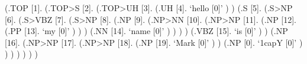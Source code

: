 \documentclass[10pt]{article}
\begin{document}
\begin{parsetree}  (.TOP [1]. (.TOP>S [2]. (.TOP>UH [3]. (.UH [4]. `hello [0]' ) ) (.S [5]. (.S>NP [6]. (.S>VBZ [7]. (.S>NP [8]. (.NP [9]. (.NP>NN [10]. (.NP>NP [11]. (.NP [12]. (.PP [13]. `my [0]' ) ) ) (.NN [14]. `name [0]' ) ) ) ) (.VBZ [15]. `is [0]' ) ) (.NP [16]. (.NP>NP [17]. (.NP>NP [18]. (.NP [19]. `Mark [0]' ) ) (.NP [0]. `1capY [0]' ) ) ) ) ) ) ) \end{parsetree}
\end{document}
